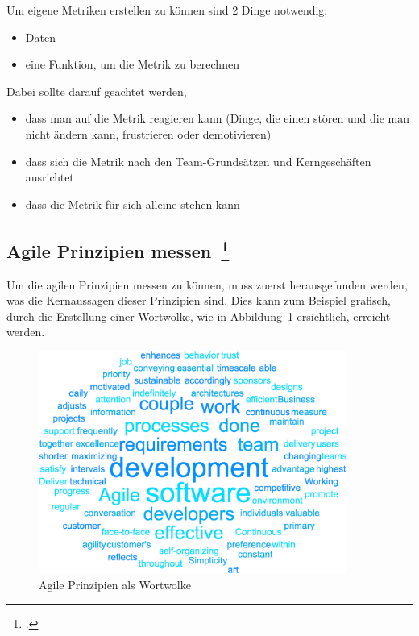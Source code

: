 Um eigene Metriken erstellen zu können sind 2 Dinge notwendig:
\begin{itemize}
  \item Daten
  \item eine Funktion, um die Metrik zu berechnen
\end{itemize}

Dabei sollte darauf geachtet werden,
\begin{itemize}
  \item dass man auf die Metrik reagieren kann (Dinge, die einen stören und die man nicht ändern kann, frustrieren oder demotivieren)
  \item dass sich die Metrik nach den Team-Grundsätzen und Kerngeschäften ausrichtet
  \item dass die Metrik für sich alleine stehen kann
\end{itemize}

\subsection[Agile Prinzipien messen]{Agile Prinzipien messen~\footcite[vgl.][S.201ff]{davis_agile_2015}}

Um die agilen Prinzipien messen zu können, muss zuerst herausgefunden werden, was die Kernaussagen dieser Prinzipien sind.
Dies kann zum Beispiel grafisch, durch die Erstellung einer Wortwolke, wie in Abbildung~\ref{fig:wordcloud_principles} ersichtlich, erreicht werden.

\begin{savenotes}
  \begin{figure}[H] 
    \centering
    \includegraphics[width=0.9\textwidth]{img/principles-wordcloud.png}
    \caption{Agile Prinzipien als Wortwolke}\label{fig:wordcloud_principles}
  \end{figure}
\end{savenotes}

